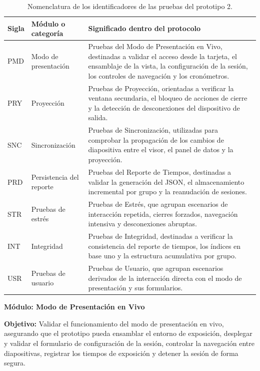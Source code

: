 \documentclass[11pt]{article}
\begin{document}
\begin{table}[H]
    \centering
    \renewcommand{\arraystretch}{1.2}
    \begin{tabularx}{\textwidth}{|>{\centering\arraybackslash}p{1.5cm}|p{4.6cm}|X|}
        \hline
        \textbf{Sigla} & \textbf{Módulo o categoría} & \textbf{Significado dentro del protocolo} \\
        \hline
        PMD & Modo de presentación & Pruebas del Modo de Presentación en Vivo, destinadas a validar el acceso desde la tarjeta, el ensamblaje de la vista, la configuración de la sesión, los controles de navegación y los cronómetros. \\
        \hline
        PRY & Proyección & Pruebas de Proyección, orientadas a verificar la ventana secundaria, el bloqueo de acciones de cierre y la detección de desconexiones del dispositivo de salida. \\
        \hline
        SNC & Sincronización & Pruebas de Sincronización, utilizadas para comprobar la propagación de los cambios de diapositiva entre el visor, el panel de datos y la proyección. \\
        \hline
        PRD & Persistencia del reporte & Pruebas del Reporte de Tiempos, destinadas a validar la generación del JSON, el almacenamiento incremental por grupo y la reanudación de sesiones. \\
        \hline
        STR & Pruebas de estrés & Pruebas de Estrés, que agrupan escenarios de interacción repetida, cierres forzados, navegación intensiva y desconexiones abruptas. \\
        \hline
        INT & Integridad & Pruebas de Integridad, destinadas a verificar la consistencia del reporte de tiempos, los índices en base uno y la estructura acumulativa por grupo. \\
        \hline
        USR & Pruebas de usuario & Pruebas de Usuario, que agrupan escenarios derivados de la interacción directa con el modo de presentación y sus formularios. \\
        \hline
    \end{tabularx}
    \caption{Nomenclatura de los identificadores de las pruebas del prototipo 2.}
    \label{tab:nomenclatura-pruebas-prototipo-2}
\end{table}

\textbf{Módulo: Modo de Presentación en Vivo}

\textbf{Objetivo:} Validar el funcionamiento del modo de presentación en vivo, asegurando que el prototipo pueda ensamblar el entorno de exposición, desplegar y validar el formulario de configuración de la sesión, controlar la navegación entre diapositivas, registrar los tiempos de exposición y detener la sesión de forma segura.
\end{document}
